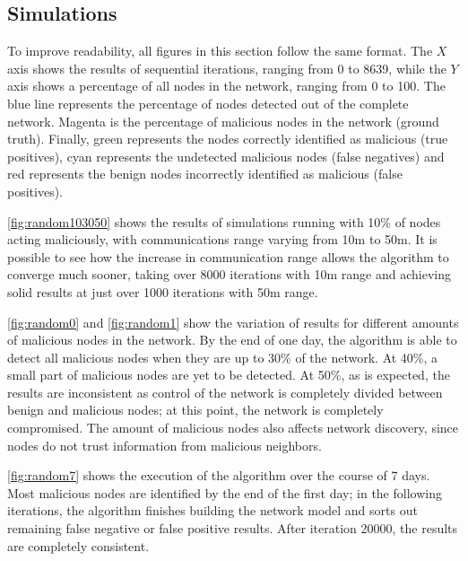 \documentclass[conference]{IEEEtran}
\begin{document}
\subsection{Simulations}
\label{subsection:simulations}
To improve readability, all figures in this section follow the same format.
The $X$ axis shows the results of sequential iterations, ranging from 0 to 8639, while the $Y$ axis shows a percentage of all nodes in the network, ranging from 0 to 100.
The blue line represents the percentage of nodes detected out of the complete network.
Magenta is the percentage of malicious nodes in the network (ground truth).
Finally, green represents the nodes correctly identified as malicious (true positives), cyan represents the undetected malicious nodes (false negatives) and red represents the benign nodes incorrectly identified as malicious (false positives).


\autoref{fig:random103050} shows the results of simulations running with 10\% of nodes acting maliciously, with communications range varying from 10m to 50m.
It is possible to see how the increase in communication range allows the algorithm to converge much sooner, taking over 8000 iterations with 10m range and achieving solid results at just over 1000 iterations with 50m range. 

\autoref{fig:random0} and \autoref{fig:random1} show the variation of results for different amounts of malicious nodes in the network.
By the end of one day, the algorithm is able to detect all malicious nodes when they are up to 30\% of the network.
At 40\%, a small part of malicious nodes are yet to be detected.
At 50\%, as is expected, the results are inconsistent as control of the network is completely divided between benign and malicious nodes; at this point, the network is completely compromised.
The amount of malicious nodes also affects network discovery, since nodes do not trust information from malicious neighbors.

\autoref{fig:random7} shows the execution of the algorithm over the course of 7 days.
Most malicious nodes are identified by the end of the first day; in the following iterations, the algorithm finishes building the network model and sorts out remaining false negative or false positive results.
After iteration 20000, the results are completely consistent.


\end{document}
